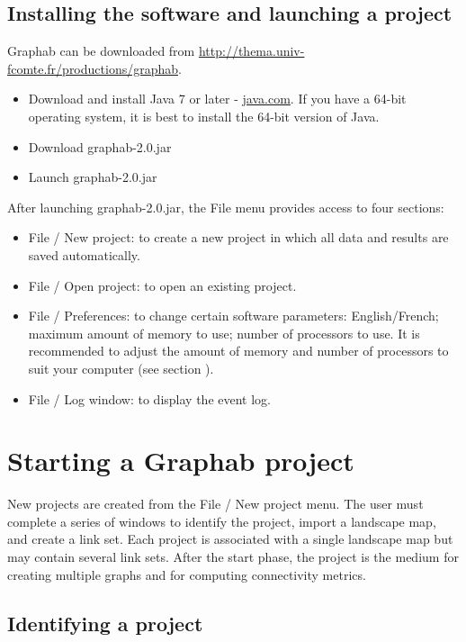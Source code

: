 \documentclass{article}
\begin{document}
\subsection{Installing the software and launching a project}

Graphab can be downloaded from \url{http://thema.univ-fcomte.fr/productions/graphab}.

\begin{itemize}
	\item Download and install Java 7 or later - \href{http://www.java.com}{java.com}. If you have a 64-bit operating system, it is best to install the 64-bit version of Java.
	\item Download graphab-2.0.jar
	\item Launch graphab-2.0.jar
\end{itemize}
After launching graphab-2.0.jar, the File menu provides access to four sections:
\begin{itemize}
	\item File / New project: to create a new project in which all data and results are saved automatically.  
	\item File / Open project: to open an existing project.
	\item File / Preferences: to change certain software parameters: English/French; maximum amount of memory to use; number of processors to use. It is recommended to adjust the amount of memory and number of processors to suit your computer (see section ).
	\item File / Log window: to display the event log.
\end{itemize}

\section{Starting a Graphab project }

New projects are created from the File / New project menu. The user must complete a series of windows to identify the project, import a landscape map, and create a link set. Each project is associated with a single landscape map but may contain several link sets. After the start phase, the project is the medium for creating multiple graphs and for computing connectivity metrics. 

\subsection{Identifying a project}
\end{document}
